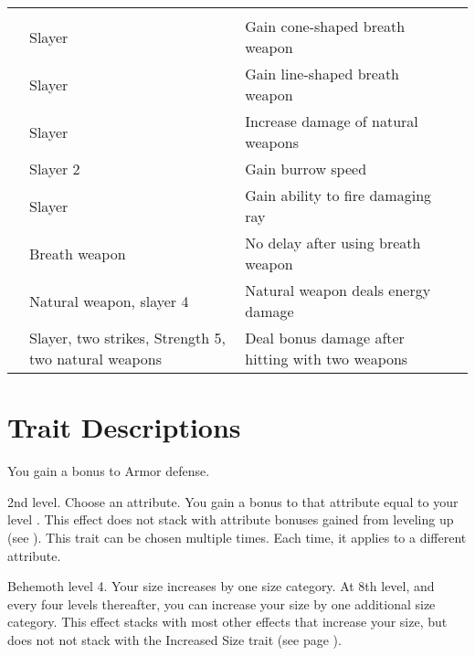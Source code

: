 \begin{longtabuwrapper}
\begin{longtabu}{>{\lcol}p{10em} >{\lcol}p{15em} >{\lcol}X >{\lcol}p{3em}}
            \midrule
            \label{Slayer Traits} &  &  &  \\
             & Slayer & Gain cone-shaped breath weapon &  \\
             & Slayer & Gain line-shaped breath weapon &  \\
             & Slayer & Increase damage of natural weapons &  \\
             & Slayer 2 & Gain burrow speed &  \\
             & Slayer & Gain ability to fire damaging ray &  \\
             & Breath weapon & No delay after using breath weapon &  \\
             & Natural weapon, slayer 4 & Natural weapon deals energy damage &  \\
             & Slayer, two strikes, Strength 5, two natural weapons & Deal bonus damage after hitting with two weapons &  \\
        \end{longtabu}
    \end{longtabuwrapper}

    \twocolumn

\section{Trait Descriptions}

    \featben You gain a  bonus to Armor defense.

    \featpre 2nd level.
    \featben Choose an attribute.
    You gain a bonus to that attribute equal to your level .
    This effect does not stack with attribute bonuses gained from leveling up (see ).
     This trait can be chosen multiple times.
    Each time, it applies to a different attribute.

    \featpre Behemoth level 4.
    \featben Your size increases by one size category.
    At 8th level, and every four levels thereafter, you can increase your size by one additional size category.
    This effect stacks with most other effects that increase your size, but does not not stack with the Increased Size trait (see page ).

